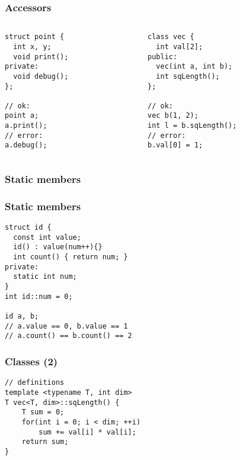 \begin{frame}[fragile]
\frametitle{Accessors}
\lstset{
  xrightmargin=0cm
}
\begin{columns}[c]
  \begin{column}{0.5\textwidth}
\begin{lstlisting}
struct point {
  int x, y;
  void print();
private:
  void debug();
};

// ok:
point a;
a.print();
// error:
a.debug();
\end{lstlisting}
  \end{column}
  \begin{column}{0.5\textwidth}
\lstset{ numbers=none, xleftmargin=0cm }
\begin{lstlisting}
class vec {
  int val[2];
public:
  vec(int a, int b);
  int sqLength();
};

// ok:
vec b(1, 2);
int l = b.sqLength();
// error:
b.val[0] = 1;
\end{lstlisting}
  \end{column}
\end{columns}
\end{frame}

\begin{frame}[fragile]
\frametitle{Static members}
\end{frame}

\begin{frame}[fragile]
\frametitle{Static members}
\begin{lstlisting}
struct id {
  const int value;
  id() : value(num++){}
  int count() { return num; }
private:
  static int num;
}
int id::num = 0;

id a, b;
// a.value == 0, b.value == 1
// a.count() == b.count() == 2
\end{lstlisting}
\end{frame}

\begin{frame}[fragile]
\frametitle{Classes (2)}
\begin{lstlisting}
// definitions
template <typename T, int dim>
T vec<T, dim>::sqLength() {
    T sum = 0;
    for(int i = 0; i < dim; ++i)
        sum += val[i] * val[i];
    return sum;
}
\end{lstlisting}
\end{frame}

